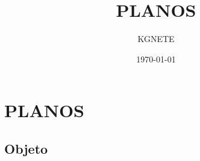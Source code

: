 \documentclass{article}
\title{PLANOS}
\author{KGNETE}
\date{\today}
\begin{document}
\maketitle
\tableofcontents


\chapter{PLANOS}

\section{Objeto}
\end{document}
